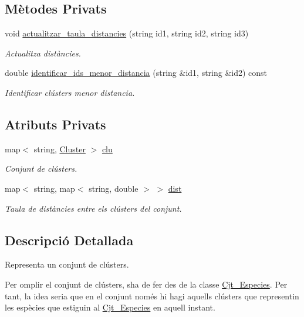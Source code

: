 \subsection*{Mètodes Privats}
\begin{DoxyCompactItemize}
\item 
void \hyperlink{class_cjt___clusters_a15ac7653c39fe7ed1f2e21debeb3b24b}{actualitzar\+\_\+taula\+\_\+distancies} (string id1, string id2, string id3)
\begin{DoxyCompactList}\small\item\em Actualitza distàncies. \end{DoxyCompactList}\item 
double \hyperlink{class_cjt___clusters_a3d2a5fe0c02b0b74d030447fc601e9f9}{identificar\+\_\+ids\+\_\+menor\+\_\+distancia} (string \&id1, string \&id2) const
\begin{DoxyCompactList}\small\item\em Identificar clústers menor distancia. \end{DoxyCompactList}\end{DoxyCompactItemize}
\subsection*{Atributs Privats}
\begin{DoxyCompactItemize}
\item 
map$<$ string, \hyperlink{class_cluster}{Cluster} $>$ \hyperlink{class_cjt___clusters_a86fd6089c4e49eaedea86d5ec4ee6495}{clu}
\begin{DoxyCompactList}\small\item\em Conjunt de clústers. \end{DoxyCompactList}\item 
map$<$ string, map$<$ string, double $>$ $>$ \hyperlink{class_cjt___clusters_afde449634787205786301b40e053fe91}{dist}
\begin{DoxyCompactList}\small\item\em Taula de distàncies entre els clústers del conjunt. \end{DoxyCompactList}\end{DoxyCompactItemize}


\subsection{Descripció Detallada}
Representa un conjunt de clústers. 

Per omplir el conjunt de clústers, s\textquotesingle{}ha de fer des de la classe \hyperlink{class_cjt___especies}{Cjt\+\_\+\+Especies}. Per tant, la idea seria que en el conjunt només hi hagi aquells clústers que representin les espècies que estiguin al \hyperlink{class_cjt___especies}{Cjt\+\_\+\+Especies} en aquell instant.

